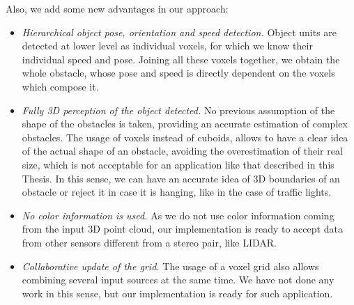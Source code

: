 Also, we add some new advantages in our approach:
\begin{itemize}
 \item \emph{Hierarchical object pose, orientation and speed detection.} Object units are detected at lower level as individual voxels, for which we know their individual speed and pose. Joining all these voxels together, we obtain the whole obstacle, whose pose and speed is directly dependent on the voxels which compose it. 
 \item \emph{Fully 3D perception of the object detected.} No previous assumption of the shape of the obstacles is taken, providing an accurate estimation of complex obstacles. The usage of voxels instead of cuboids, allows to have a clear idea of the actual shape of an obstacle, avoiding the overestimation of their real size, which is not acceptable for an application like that described in this Thesis. In this sense, we can have an accurate idea of 3D boundaries of an obstacle or reject it in case it is hanging, like in the case of traffic lights.
 \item \emph{No color information is used.} As we do not use color information coming from the input 3D point cloud, our implementation is ready to accept data from other sensors different from a stereo pair, like \acs{LIDAR}.
 \item \emph{Collaborative update of the grid.} The usage of a voxel grid also allows combining several input sources at the same time. We have not done any work in this sense, but our implementation is ready for such application.
\end{itemize}

